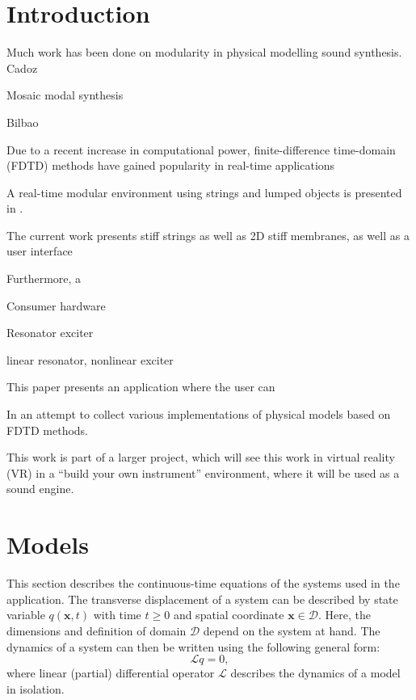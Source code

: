 \documentclass{article}
\title{\papertitle}
\begin{document}
%
\capstartfalse
\maketitle
\capstarttrue
%
\begin{abstract}

\end{abstract}
%

\section{Introduction}\label{sec:introduction}

Much work has been done on modularity in physical modelling sound synthesis. 
Cadoz \cite{Cadoz1983}

Mosaic \cite{Morrison1993} modal synthesis

Bilbao 

Due to a recent increase in computational power, finite-difference time-domain (FDTD) methods have gained popularity in real-time applications 

A real-time modular environment using strings and lumped objects is presented in \cite{Bilbao2019}. 

The current work presents stiff strings as well as 2D stiff membranes, as well as a user interface

Furthermore, a 


Consumer hardware 


Resonator exciter \cite{Borin1989}

linear resonator, nonlinear exciter


This paper presents an application where the user can

In an attempt to collect various implementations of physical models based on FDTD methods. 

This work is part of a larger project, which will see this work in virtual reality (VR) in a ``build your own instrument'' environment, where it will be used as a sound engine.

\section{Models}
This section describes the continuous-time equations of the systems used in the application. The transverse displacement of a system can be described by state variable $q(\boldsymbol{x}, t)$ with time $t\geq 0$ and spatial coordinate $\boldsymbol{x}\in \mathcal{D}$. Here, the dimensions and definition of domain $\mathcal{D}$ depend on the system at hand. The dynamics of a system can then be written using the following general form:
\begin{equation}\label{eq:generalForm}
    \mathcal{L}q = 0,
\end{equation}
where linear (partial) differential operator $\mathcal{L}$ describes the dynamics of a model in isolation.
\end{document}
